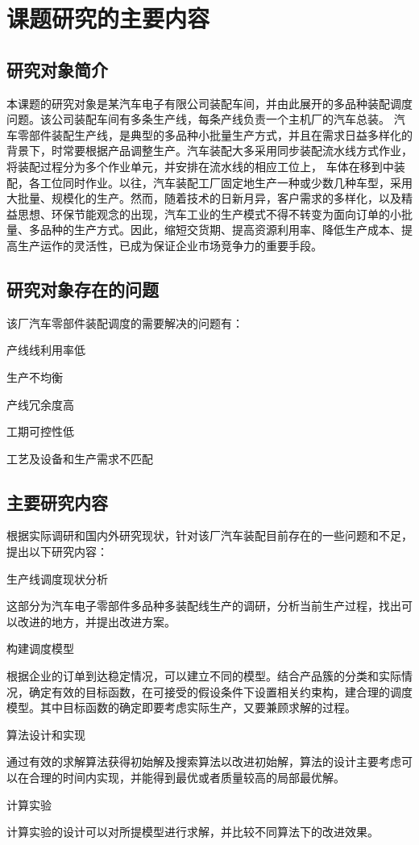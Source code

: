 
\chapter{课题研究的主要内容}
\section{研究对象简介}
本课题的研究对象是某汽车电子有限公司装配车间，并由此展开的多品种装配调度问题。该公司装配车间有多条生产线，每条产线负责一个主机厂的汽车总装。
汽车零部件装配生产线，是典型的多品种小批量生产方式，并且在需求日益多样化的背景下，时常要根据产品调整生产。汽车装配大多采用同步装配流水线方式作业，将装配过程分为多个作业单元，并安排在流水线的相应工位上，
车体在移到中装配，各工位同时作业。以往，汽车装配工厂固定地生产一种或少数几种车型，采用大批量、规模化的生产。然而，随着技术的日新月异，客户需求的多样化，以及精益思想、环保节能观念的出现，汽车工业的生产模式不得不转变为面向订单的小批量、多品种的生产方式。因此，缩短交货期、提高资源利用率、降低生产成本、提高生产运作的灵活性，已成为保证企业市场竞争力的重要手段。

\section{研究对象存在的问题}
该厂汽车零部件装配调度的需要解决的问题有：
\begin{asparaenum}[(1)]
\item 产线线利用率低
\item 生产不均衡
\item 产线冗余度高
\item 工期可控性低
\item 工艺及设备和生产需求不匹配
\end{asparaenum}

\section{主要研究内容}
根据实际调研和国内外研究现状，针对该厂汽车装配目前存在的一些问题和不足，提出以下研究内容：
\renewcommand{\labelenumi}{(\theenumi)}
\begin{asparaenum}
\item 生产线调度现状分析

这部分为汽车电子零部件多品种多装配线生产的调研，分析当前生产过程，找出可以改进的地方，并提出改进方案。
\item 构建调度模型

根据企业的订单到达稳定情况，可以建立不同的模型。结合产品簇的分类和实际情况，确定有效的目标函数，在可接受的假设条件下设置相关约束构，建合理的调度模型。其中目标函数的确定即要考虑实际生产，又要兼顾求解的过程。
\item 算法设计和实现

通过有效的求解算法获得初始解及搜索算法以改进初始解，算法的设计主要考虑可以在合理的时间内实现，并能得到最优或者质量较高的局部最优解。
\item 计算实验
\end{asparaenum}

计算实验的设计可以对所提模型进行求解，并比较不同算法下的改进效果。